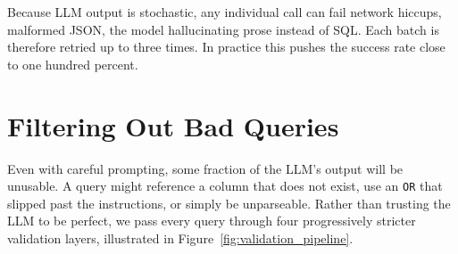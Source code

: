 Because LLM output is stochastic, any individual call can fail network hiccups, malformed JSON, the model hallucinating prose instead of SQL. Each batch is therefore retried up to three times. In practice this pushes the success rate close to one hundred percent.


\section{Filtering Out Bad Queries}

Even with careful prompting, some fraction of the LLM's output will be unusable. A query might reference a column that does not exist, use an \texttt{OR} that slipped past the instructions, or simply be unparseable. Rather than trusting the LLM to be perfect, we pass every query through four progressively stricter validation layers, illustrated in Figure~\ref{fig:validation_pipeline}.

